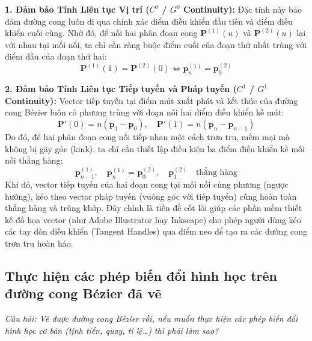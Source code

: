 \textbf{1. Đảm bảo Tính Liên tục Vị trí ($C^0$ / $G^0$ Continuity):}
Đặc tính này bảo đảm đường cong luôn đi qua chính xác điểm điều khiển đầu tiên và điểm điều khiển cuối cùng. Nhờ đó, để nối hai phân đoạn cong $\mathbf{P}^{(1)}(u)$ và $\mathbf{P}^{(2)}(u)$ lại với nhau tại mối nối, ta chỉ cần ràng buộc điểm cuối của đoạn thứ nhất trùng với điểm đầu của đoạn thứ hai:
\begin{equation}
\mathbf{P}^{(1)}(1) = \mathbf{P}^{(2)}(0) \iff \mathbf{p}_n^{(1)} = \mathbf{p}_0^{(2)}
\end{equation}

\textbf{2. Đảm bảo Tính Liên tục Tiếp tuyến và Pháp tuyến ($C^1$ / $G^1$ Continuity):}
Vector tiếp tuyến tại điểm mút xuất phát và kết thúc của đường cong Bézier luôn có phương trùng với đoạn nối hai điểm điều khiển kề mút:
\begin{equation}
\mathbf{P}'(0) = n(\mathbf{p}_1 - \mathbf{p}_0), \quad \mathbf{P}'(1) = n(\mathbf{p}_n - \mathbf{p}_{n-1})
\end{equation}
Do đó, để hai phân đoạn cong nối tiếp nhau một cách trơn tru, mềm mại mà không bị gãy góc (kink), ta chỉ cần thiết lập điều kiện ba điểm điều khiển kề mối nối thẳng hàng:
\begin{equation}
\mathbf{p}_{n-1}^{(1)}, \quad \mathbf{p}_n^{(1)} = \mathbf{p}_0^{(2)}, \quad \mathbf{p}_1^{(2)} \quad \text{thẳng hàng}
\end{equation}
Khi đó, vector tiếp tuyến của hai đoạn cong tại mối nối cùng phương (ngược hướng), kéo theo vector pháp tuyến (vuông góc với tiếp tuyến) cũng hoàn toàn thẳng hàng và trùng khớp. Đây chính là tiền đề cốt lõi giúp các phần mềm thiết kế đồ họa vector (như Adobe Illustrator hay Inkscape) cho phép người dùng kéo các tay đòn điều khiển (Tangent Handles) qua điểm neo để tạo ra các đường cong trơn tru hoàn hảo.

\subsection{Thực hiện các phép biến đổi hình học trên đường cong Bézier đã vẽ}
\label{subsec:w5_bezier_transform}

\textit{Câu hỏi: Vẽ được đường cong Bézier rồi, nếu muốn thực hiện các phép biến đổi hình học cơ bản (tịnh tiến, quay, tỉ lệ\ldots) thì phải làm sao?}


